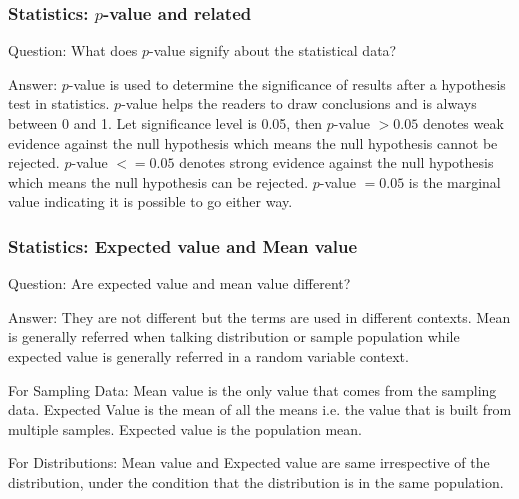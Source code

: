 \documentclass[11pt]{beamer}
\begin{document}
\begin{frame}
\frametitle{Statistics: $p$-value and related}
\begin{block}{Question:}
	What does $p$-value signify about the statistical data?
\end{block}
\begin{block}{Answer:}
	$p$-value is used to determine the significance of results after a hypothesis test in statistics. $p$-value helps the readers to draw conclusions and is always between 0 and 1. Let significance level is 0.05, then 
	$p$-value $> 0.05$ denotes weak evidence against the null hypothesis which means the null hypothesis cannot be rejected.
	$p$-value $<= 0.05$ denotes strong evidence against the null hypothesis which means the null hypothesis can be rejected.
	$p$-value $=0.05$ is the marginal value indicating it is possible to go either way.
\end{block}
\end{frame}

\begin{frame}
\frametitle{Statistics: Expected value and Mean value}
\begin{block}{Question:}
	Are expected value and mean value different?
\end{block}
\begin{block}{Answer:}
	They are not different but the terms are used in different contexts. Mean is generally referred when talking distribution or sample population while expected value is generally referred in a random variable context.
	
	For Sampling Data: Mean value is the only value that comes from the sampling data.
	Expected Value is the mean of all the means i.e. the value that is built from multiple samples. Expected value is the population mean.
	
	For Distributions: Mean value and Expected value are same irrespective of the distribution, under the condition that the distribution is in the same population.
\end{block}
\end{frame}
\end{document}
